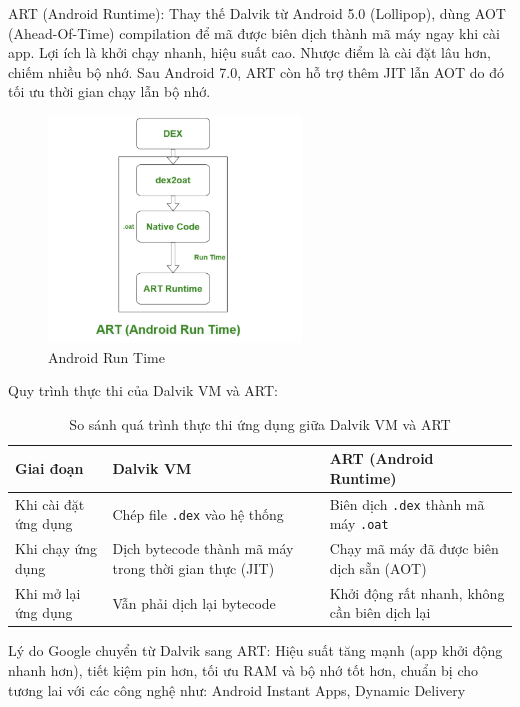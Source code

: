 \begin{flushleft}
    \hspace*{0.8cm}ART (Android Runtime): Thay thế Dalvik từ Android 5.0 (Lollipop), dùng AOT (Ahead-Of-Time) compilation để mã được biên dịch thành mã máy ngay khi cài app.
    Lợi ích là khởi chạy nhanh, hiệu suất cao.
    Nhược điểm là cài đặt lâu hơn, chiếm nhiều bộ nhớ.
    Sau Android 7.0, ART còn hỗ trợ thêm JIT lẫn AOT do đó tối ưu thời gian chạy lẫn bộ nhớ.   
    \begin{figure}[H] 
        \centering
        \includegraphics[width=0.6\textwidth]{images/ART.png}
        \caption{Android Run Time}
        \label{fig:android}
    \end{figure}  
\end{flushleft}

\begin{flushleft}
    \hspace*{0.8cm}Quy trình thực thi của Dalvik VM và ART:
    \begin{table}[H]
        \centering
        \renewcommand{\arraystretch}{1.5}
        \begin{tabular}{|p{4cm}|p{5cm}|p{5cm}|}
        \hline
        \textbf{Giai đoạn} & \textbf{Dalvik VM} & \textbf{ART (Android Runtime)} \\
        \hline
        Khi cài đặt ứng dụng & Chép file \texttt{.dex} vào hệ thống & Biên dịch \texttt{.dex} thành mã máy \texttt{.oat} \\
        \hline
        Khi chạy ứng dụng & Dịch bytecode thành mã máy trong thời gian thực (JIT) & Chạy mã máy đã được biên dịch sẵn (AOT) \\
        \hline
        Khi mở lại ứng dụng & Vẫn phải dịch lại bytecode & Khởi động rất nhanh, không cần biên dịch lại \\
        \hline
        \end{tabular}
        \caption{So sánh quá trình thực thi ứng dụng giữa Dalvik VM và ART}
        \label{tab:dalvik-vs-art}
        \end{table}
          
    \hspace*{0.8cm} Lý do Google chuyển từ Dalvik sang ART: Hiệu suất tăng mạnh (app khởi động nhanh hơn), tiết kiệm pin hơn, tối ưu RAM và bộ nhớ tốt hơn, chuẩn bị cho tương lai với các công nghệ như: Android Instant Apps, Dynamic Delivery
\end{flushleft}

